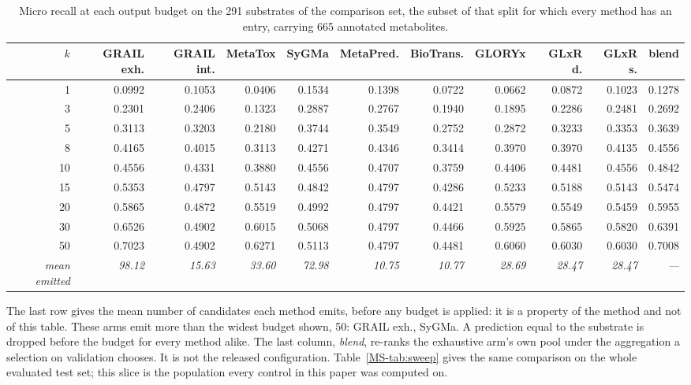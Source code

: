 \begin{table}[t]
\centering
\begin{threeparttable}
\caption{Micro recall at each output budget on the 291 substrates of the comparison set, the subset of that split for which every method has an entry, carrying 665 annotated metabolites.}
\label{tab:sweep-comparison}
\scriptsize
\setlength{\tabcolsep}{3pt}
\begin{tabular}{rrrrrrrrrrr}
\toprule
$k$ & GRAIL exh. & GRAIL int. & MetaTox & SyGMa & MetaPred. & BioTrans. & GLORYx & GLxR d. & GLxR s. & blend \\
\midrule
1 & 0.0992 & 0.1053 & 0.0406 & 0.1534 & 0.1398 & 0.0722 & 0.0662 & 0.0872 & 0.1023 & 0.1278 \\
3 & 0.2301 & 0.2406 & 0.1323 & 0.2887 & 0.2767 & 0.1940 & 0.1895 & 0.2286 & 0.2481 & 0.2692 \\
5 & 0.3113 & 0.3203 & 0.2180 & 0.3744 & 0.3549 & 0.2752 & 0.2872 & 0.3233 & 0.3353 & 0.3639 \\
8 & 0.4165 & 0.4015 & 0.3113 & 0.4271 & 0.4346 & 0.3414 & 0.3970 & 0.3970 & 0.4135 & 0.4556 \\
10 & 0.4556 & 0.4331 & 0.3880 & 0.4556 & 0.4707 & 0.3759 & 0.4406 & 0.4481 & 0.4556 & 0.4842 \\
15 & 0.5353 & 0.4797 & 0.5143 & 0.4842 & 0.4797 & 0.4286 & 0.5233 & 0.5188 & 0.5143 & 0.5474 \\
20 & 0.5865 & 0.4872 & 0.5519 & 0.4992 & 0.4797 & 0.4421 & 0.5579 & 0.5549 & 0.5459 & 0.5955 \\
30 & 0.6526 & 0.4902 & 0.6015 & 0.5068 & 0.4797 & 0.4466 & 0.5925 & 0.5865 & 0.5820 & 0.6391 \\
50 & 0.7023 & 0.4902 & 0.6271 & 0.5113 & 0.4797 & 0.4481 & 0.6060 & 0.6030 & 0.6030 & 0.7008 \\
\midrule
\emph{mean emitted} & \emph{98.12} & \emph{15.63} & \emph{33.60} & \emph{72.98} & \emph{10.75} & \emph{10.77} & \emph{28.69} & \emph{28.47} & \emph{28.47} & \emph{---} \\
\bottomrule
\end{tabular}
\begin{tablenotes}[flushleft]\footnotesize
\item The last row gives the mean number of candidates each method emits, before any budget is applied: it is a property of the method and not of this table. These arms emit more than the widest budget shown, 50: GRAIL exh., SyGMa. A prediction equal to the substrate is dropped before the budget for every method alike. The last column, \emph{blend}, re-ranks the exhaustive arm's own pool under the aggregation a selection on validation chooses. It is not the released configuration. Table~\ref{MS-tab:sweep} gives the same comparison on the whole evaluated test set; this slice is the population every control in this paper was computed on.
\end{tablenotes}
\end{threeparttable}
\end{table}

